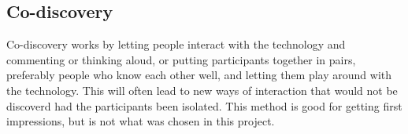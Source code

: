 \subsection{Co-discovery}
Co-discovery works by letting people interact with the technology and commenting or thinking aloud, or putting participants together in pairs, preferably people who know each other well, and letting them play around with the technology. This will often lead to new ways of interaction that would not be discoverd had the participants been isolated. This method is good for getting first impressions, but is not what was chosen in this project.